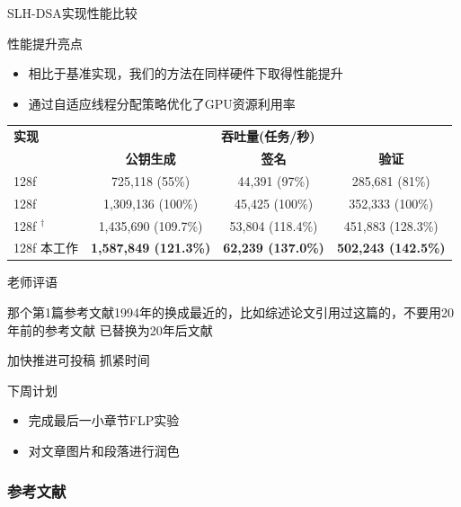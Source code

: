 \documentclass{beamer}
\begin{document}
\begin{frame}{SLH-DSA实现性能比较}
  \begin{block}{性能提升亮点}
    \begin{itemize}
      \item 相比于基准实现，我们的方法在同样硬件下取得性能提升
      \item 通过自适应线程分配策略优化了GPU资源利用率
    \end{itemize}
  \end{block}
  \begin{center}
    \scriptsize
    \begin{tabular}{lccc}
      \toprule
      \textbf{实现} & \multicolumn{3}{c}{\textbf{吞吐量(任务/秒)}} \\
      \cmidrule(lr){2-4}
      & \textbf{公钥生成} & \textbf{签名} & \textbf{验证} \\
      \midrule
      128f \cite{Kim2024} & 725,118 (55\%) & 44,391 (97\%) & 285,681 (81\%) \\
      128f \cite{Wang2025} & 1,309,136 (100\%) & 45,425 (100\%) & 352,333 (100\%) \\
      128f \cite{Wang2025}$^\dagger$ & 1,435,690 (109.7\%) & 53,804 (118.4\%) & 451,883 (128.3\%) \\
      128f 本工作 & \textbf{1,587,849 (121.3\%)} & \textbf{62,239 (137.0\%)} & \textbf{502,243 (142.5\%)} \\
      \bottomrule
    \end{tabular}
  \end{center}

\end{frame}

\begin{frame}{老师评语}
  \begin{alertblock}{那个第1篇参考文献1994年的换成最近的，比如综述论文引用过这篇的，不要用20年前的参考文献}
    已替换为20年后文献
  \end{alertblock}
  \begin{alertblock}{加快推进可投稿}
    抓紧时间
  \end{alertblock}

  \begin{block}{下周计划}
    \begin{itemize}
      \item 完成最后一小章节FLP实验
      \item 对文章图片和段落进行润色
    \end{itemize}
  \end{block}
\end{frame}

\begin{frame}
  \frametitle{参考文献}
  
  
\end{frame}
\end{document}
